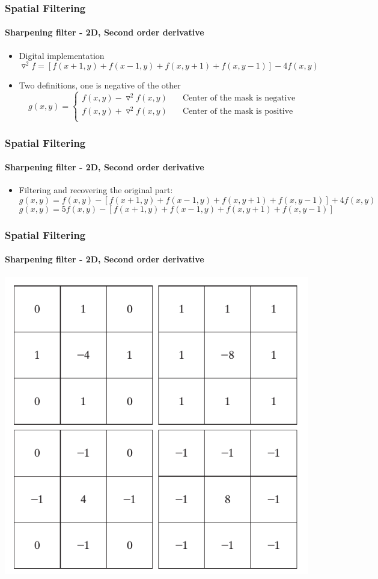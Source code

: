 \documentclass[table]{beamer}
\begin{document}
\begin{frame}
\frametitle{Spatial Filtering}
\framesubtitle{Sharpening filter - 2D, Second order derivative}
\begin{itemize}
\item Digital implementation 
$$\triangledown^2 f = [f(x+1,y)+f(x-1,y)+f(x,y+1)+f(x,y-1)]-4f(x,y)$$
\item Two definitions, one is negative of the other
\[ g(x,y) =
  \begin{cases}
    f(x,y)-\triangledown^2 f(x,y)  & \quad \text{Center of the mask is negative} \\
    f(x,y)+\triangledown^2 f(x,y)  & \quad \text{Center of the mask is positive} \\
  \end{cases}
\]
\end{itemize}
\end{frame}
\begin{frame}
\frametitle{Spatial Filtering}
\framesubtitle{Sharpening filter - 2D, Second order derivative}
\begin{itemize}
\item Filtering and recovering the original part: 
\scriptsize{
$$ g(x,y) = f(x,y) - [f(x+1,y)+f(x-1,y)+f(x,y+1)+f(x,y-1)]+4f(x,y)$$
$$ g(x,y) = 5f(x,y) - [f(x+1,y)+f(x-1,y)+f(x,y+1)+f(x,y-1)]$$
}
\end{itemize}
\end{frame}
\begin{frame}
\frametitle{Spatial Filtering}
\framesubtitle{Sharpening filter - 2D, Second order derivative}
\begin{center}\includegraphics[scale=0.3]{images/Spatial7-laplacian.png}\end{center}
\end{frame}
\end{document}
